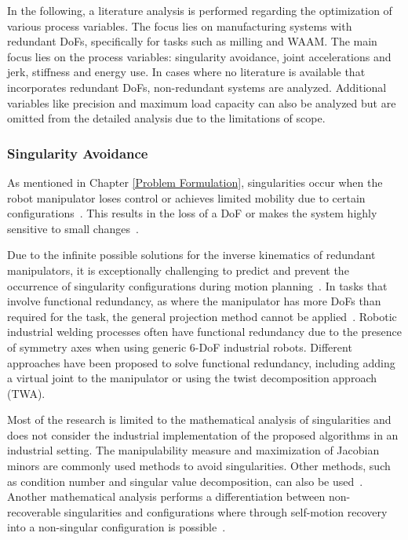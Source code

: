 \documentclass[conference]{IEEEtran}
\begin{document}
In the following, a literature analysis is performed regarding the optimization of various process variables. The focus lies on manufacturing systems with redundant DoFs, specifically for tasks such as milling and WAAM. 
The main focus lies on the process variables: singularity avoidance, joint accelerations and jerk, stiffness and energy use. In cases where no literature is available that incorporates redundant DoFs, non-redundant systems are analyzed. Additional variables like precision and maximum load capacity can also be analyzed but are omitted from the detailed analysis due to the limitations of scope.\newline
\subsubsection{Singularity Avoidance}
As mentioned in Chapter \ref{Problem Formulation}, singularities occur when the robot manipulator loses control or achieves limited mobility due to certain configurations~\cite{Malyshev.2022}. This results in the loss of a DoF or makes the system highly sensitive to small changes~\cite{Zhao.2021, Milenkovic.2021}.


Due to the infinite possible solutions for the inverse kinematics of redundant manipulators, it is exceptionally challenging to predict and prevent the occurrence of singularity configurations during motion planning~\cite{Shi.2021}. In tasks that involve functional redundancy, as where the manipulator has more DoFs than required for the task, the general projection method cannot be applied~\cite{Wei.2014}. Robotic industrial welding processes often have functional redundancy due to the presence of symmetry axes when using generic 6-DoF industrial robots. Different approaches have been proposed to solve functional redundancy, including adding a virtual joint to the manipulator or using the twist decomposition approach (TWA).

Most of the research is limited to the mathematical analysis of singularities and does not consider the industrial implementation of the proposed algorithms in an industrial setting. The manipulability measure and maximization of Jacobian minors are commonly used methods to avoid singularities. Other methods, such as condition number and singular value decomposition, can also be used~\cite{Stevenson.}. Another mathematical analysis performs a differentiation between non-recoverable singularities and configurations where through self-motion recovery into a non-singular configuration is possible~\cite{Bedrossian.2002}.
\end{document}

